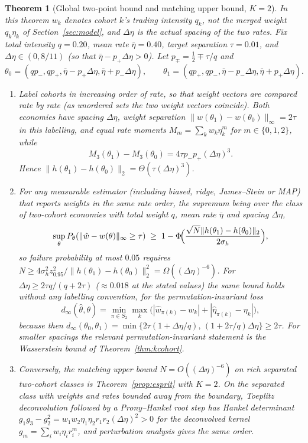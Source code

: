 \documentclass[12pt]{article}
\newtheorem{theorem}{Theorem}[section]
\theoremstyle{definition}
\theoremstyle{remark}
\begin{document}
\begin{theorem}[Global two-point bound and matching upper bound, $K=2$]\label{thm:twocohort}
In this theorem $w_k$ denotes cohort $k$'s trading intensity $q_k$, not the merged weight $q_k\eta_k$ of Section~\ref{sec:model}, and $\Delta\eta$ is the actual spacing of the two rates. Fix total intensity $q=0.20$, mean rate $\bar\eta=0.40$, target separation $\tau=0.01$, and $\Delta\eta\in(0,8/11)$ (so that $\bar\eta-p_+\Delta\eta>0$). Let $p_\mp=\tfrac12\mp\tau/q$ and
\begin{equation}\label{eq:pair}
\theta_0=(qp_-,qp_+,\bar\eta-p_+\Delta\eta,\bar\eta+p_-\Delta\eta),\qquad\theta_1=(qp_+,qp_-,\bar\eta-p_-\Delta\eta,\bar\eta+p_+\Delta\eta).
\end{equation}
\begin{enumerate}[label=(\roman*)]
\item Label cohorts in increasing order of rate, so that weight vectors are compared rate by rate (as unordered sets the two weight vectors coincide). Both economies have spacing $\Delta\eta$, weight separation $\|w(\theta_1)-w(\theta_0)\|_\infty=2\tau$ in this labelling, and equal rate moments $M_m=\sum_kw_k\eta_k^m$ for $m\in\{0,1,2\}$, while
\begin{equation}\label{eq:dM3}
M_3(\theta_1)-M_3(\theta_0)=4\tau p_-p_+(\Delta\eta)^3 .
\end{equation}
Hence $\|h(\theta_1)-h(\theta_0)\|_2=\Theta(\tau(\Delta\eta)^3)$.
\item For any measurable estimator (including biased, ridge, James--Stein or MAP) that reports weights in the same rate order, the supremum being over the class of two-cohort economies with total weight $q$, mean rate $\bar\eta$ and spacing $\Delta\eta$,
\begin{equation}\label{eq:lecam2}
\sup_\theta P_\theta(\|\hat w-w(\theta)\|_\infty\ge\tau)\;\ge\;1-\Phi\!\Bigl(\frac{\sqrt N\|h(\theta_1)-h(\theta_0)\|_2}{2\sigma_h}\Bigr),
\end{equation}
so failure probability at most $0.05$ requires $N\ge4\sigma_h^2z_{0.95}^2/\|h(\theta_1)-h(\theta_0)\|_2^2=\Omega((\Delta\eta)^{-6})$. For $\Delta\eta\ge2\tau q/(q+2\tau)$ ($\approx0.018$ at the stated values) the same bound holds without any labelling convention, for the permutation-invariant loss
\[
d_\infty(\hat\theta,\theta)=\min_{\pi\in S_2}\max_{k}\bigl(|\hat w_{\pi(k)}-w_k|+|\hat\eta_{\pi(k)}-\eta_k|\bigr),
\]
because then $d_\infty(\theta_0,\theta_1)=\min\{2\tau(1+\Delta\eta/q),\,(1+2\tau/q)\Delta\eta\}\ge2\tau$. For smaller spacings the relevant permutation-invariant statement is the Wasserstein bound of Theorem~\ref{thm:kcohort}.
\item Conversely, the matching upper bound $N=O((\Delta\eta)^{-6})$ on rich separated two-cohort classes is Theorem~\ref{prop:esprit} with $K=2$. On the separated class with weights and rates bounded away from the boundary, Toeplitz deconvolution followed by a Prony--Hankel root step has Hankel determinant $g_1g_3-g_2^2=w_1w_2\eta_1\eta_2r_1r_2(\Delta\eta)^2>0$ for the deconvolved kernel $g_m=\sum_iw_i\eta_ir_i^m$, and perturbation analysis gives the same order.
\end{enumerate}
\end{theorem}
\end{document}
